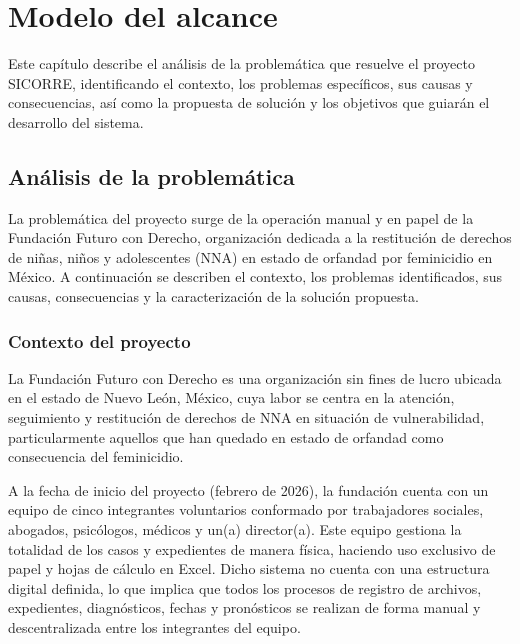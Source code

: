 
\chapter{Modelo del alcance}
\label{cap:alcance}

Este capítulo describe el análisis de la problemática que resuelve el proyecto SICORRE, 
identificando el contexto, los problemas específicos, sus causas y consecuencias, así como 
la propuesta de solución y los objetivos que guiarán el desarrollo del sistema.

\section{Análisis de la problemática}

La problemática del proyecto surge de la operación manual y en papel de la Fundación 
Futuro con Derecho, organización dedicada a la restitución de derechos de niñas, niños y 
adolescentes (NNA) en estado de orfandad por feminicidio en México. A continuación 
se describen el contexto, los problemas identificados, sus causas, consecuencias y la 
caracterización de la solución propuesta.

\subsection{Contexto del proyecto}

La Fundación Futuro con Derecho es una organización sin fines de lucro ubicada en el 
estado de Nuevo León, México, cuya labor se centra en la atención, seguimiento y 
restitución de derechos de NNA en situación de vulnerabilidad, particularmente aquellos 
que han quedado en estado de orfandad como consecuencia del feminicidio.

A la fecha de inicio del proyecto (febrero de 2026), la fundación cuenta con un equipo de 
cinco integrantes voluntarios conformado por trabajadores sociales, abogados, psicólogos, 
médicos y un(a) director(a). Este equipo gestiona la totalidad de los casos y expedientes 
de manera física, haciendo uso exclusivo de papel y hojas de cálculo en Excel. Dicho 
sistema no cuenta con una estructura digital definida, lo que implica que todos los procesos 
de registro de archivos, expedientes, diagnósticos, fechas y pronósticos se realizan de 
forma manual y descentralizada entre los integrantes del equipo.

